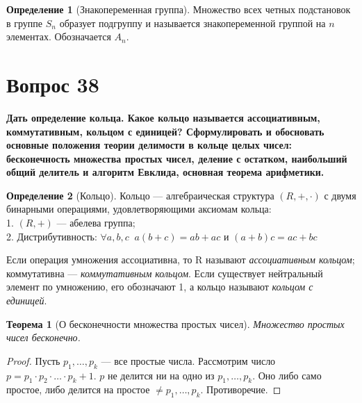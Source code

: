 \documentclass[a4paper]{article}
\theoremstyle{definition}
\newtheorem{definition}{Определение}
\theoremstyle{plain}
\newtheorem{theorem}{Теорема}
\begin{document}
\begin{definition}[Знакопеременная группа]
  Множество всех четных подстановок в группе $S_{n}$ образует подгруппу и называется знакопеременной группой на $n$ элементах.
  Обозначается $A_{n}$.
\end{definition}

\section{Вопрос 38}
\textbf{Дать определение кольца. Какое кольцо называется ассоциативным, коммутативным, кольцом с единицей?
Сформулировать и обосновать основные положения теории делимости в кольце целых чисел: бесконечность множества простых чисел, деление с остатком, наибольший общий делитель и алгоритм Евклида, основная теорема арифметики.}

\begin{definition}[Кольцо]
  Кольцо --- алгебраическая структура $(R,+,\cdot)$ с двумя бинарными операциями, удовлетворяющими аксиомам кольца:\\
  1. $(R, +)$ --- абелева группа;\\
  2. Дистрибутивность: $\forall a, b, c\ $ $a(b + c) = ab + ac$ и $(a + b)c = ac + bc$
\end{definition}
Если операция умножения ассоциативна, то R называют \emph{ассоциативным кольцом}; коммутативна --- \emph{коммутативным кольцом}.
Если существует нейтральный элемент по умножению, его обозначают 1, а кольцо называют \emph{кольцом с единицей}.

\begin{theorem}[О бесконечности множества простых чисел]
  Множество простых чисел бесконечно.
\end{theorem}
\begin{proof}
  Пусть $p_{1},\ldots,p_{k}$ --- все простые числа.
  Рассмотрим число $p = p_{1} \cdot p_{2} \cdot \ldots \cdot p_{k} + 1$.
  $p$ не делится ни на одно из $p_{1},\ldots,p_{k}$.
  Оно либо само простое, либо делится на простое $\neq p_{1},\ldots,p_{k}$. Противоречие.
\end{proof}
\end{document}
